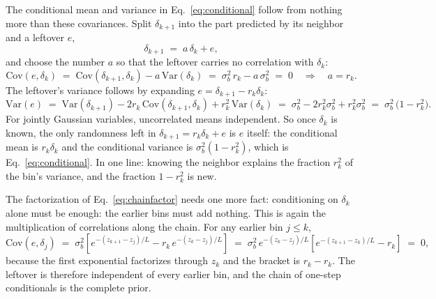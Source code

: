 \documentclass[11pt]{article}
\begin{document}
The conditional mean and variance in Eq.~\eqref{eq:conditional} follow
from nothing more than these covariances.  Split $\delta_{k+1}$ into
the part predicted by its neighbor and a leftover $e$,
\begin{equation}
  \delta_{k+1} \;=\; a\,\delta_k + e ,
  \label{eq:splitleftover}
\end{equation}
and choose the number $a$ so that the leftover carries no correlation
with $\delta_k$:
\begin{equation}
  \mathrm{Cov}(e, \delta_k)
  \;=\;
  \mathrm{Cov}(\delta_{k+1}, \delta_k) - a\,\mathrm{Var}(\delta_k)
  \;=\;
  \sigma_b^2\, r_k - a\,\sigma_b^2
  \;=\; 0
  \quad\Longrightarrow\quad
  a = r_k .
  \label{eq:leftovera}
\end{equation}
The leftover's variance follows by expanding
$e = \delta_{k+1} - r_k \delta_k$:
\begin{equation}
  \mathrm{Var}(e)
  \;=\;
  \mathrm{Var}(\delta_{k+1})
  - 2 r_k\, \mathrm{Cov}(\delta_{k+1}, \delta_k)
  + r_k^2\, \mathrm{Var}(\delta_k)
  \;=\;
  \sigma_b^2 - 2 r_k^2 \sigma_b^2 + r_k^2 \sigma_b^2
  \;=\;
  \sigma_b^2\,\bigl(1 - r_k^2\bigr).
  \label{eq:leftovervar}
\end{equation}
For jointly Gaussian variables, uncorrelated means independent.  So
once $\delta_k$ is known, the only randomness left in
$\delta_{k+1} = r_k \delta_k + e$ is $e$ itself: the conditional mean
is $r_k \delta_k$ and the conditional variance is
$\sigma_b^2 (1 - r_k^2)$, which is Eq.~\eqref{eq:conditional}.  In one
line: knowing the neighbor explains the fraction $r_k^2$ of the bin's
variance, and the fraction $1 - r_k^2$ is new.

The factorization of Eq.~\eqref{eq:chainfactor} needs one more fact:
conditioning on $\delta_k$ alone must be enough: the earlier bins
must add nothing.  This is again the multiplication of correlations
along the chain.  For any earlier bin $j \le k$,
\begin{equation}
  \mathrm{Cov}(e, \delta_j)
  \;=\;
  \sigma_b^2
  \left[
    e^{-(z_{k+1} - z_j)/L} - r_k\, e^{-(z_k - z_j)/L}
  \right]
  \;=\;
  \sigma_b^2\, e^{-(z_k - z_j)/L}
  \left[
    e^{-(z_{k+1} - z_k)/L} - r_k
  \right]
  \;=\; 0 ,
  \label{eq:pastfree}
\end{equation}
because the first exponential factorizes through $z_k$ and the bracket
is $r_k - r_k$.  The leftover is therefore independent of every earlier
bin, and the chain of one-step conditionals is the complete prior.
\end{document}
